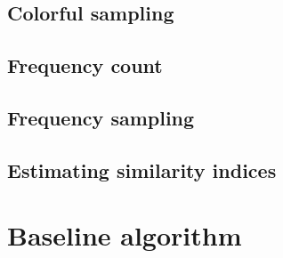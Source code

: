 \clearpage

\subsection*{Colorful sampling}

\clearpage

\subsection*{Frequency count}

\clearpage

\subsection*{Frequency sampling}

\clearpage

\subsection*{Estimating similarity indices}

\clearpage

\section{Baseline algorithm}

\clearpage
